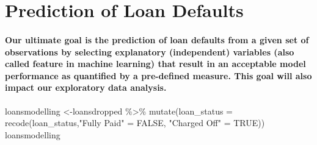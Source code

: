 \documentclass[
]{article}
\newenvironment{Shaded}{\begin{snugshade}}{\end{snugshade}}
\newcommand{\AttributeTok}[1]{\textcolor[rgb]{0.77,0.63,0.00}{#1}}
\newcommand{\ConstantTok}[1]{\textcolor[rgb]{0.00,0.00,0.00}{#1}}
\newcommand{\FunctionTok}[1]{\textcolor[rgb]{0.00,0.00,0.00}{#1}}
\newcommand{\NormalTok}[1]{#1}
\newcommand{\OtherTok}[1]{\textcolor[rgb]{0.56,0.35,0.01}{#1}}
\newcommand{\SpecialCharTok}[1]{\textcolor[rgb]{0.00,0.00,0.00}{#1}}
\newcommand{\StringTok}[1]{\textcolor[rgb]{0.31,0.60,0.02}{#1}}
\begin{document}
\hypertarget{prediction-of-loan-defaults}{%
\section{Prediction of Loan
Defaults}\label{prediction-of-loan-defaults}}

\hypertarget{our-ultimate-goal-is-the-prediction-of-loan-defaults-from-a-given-set-of-observations-by-selecting-explanatory-independent-variables-also-called-feature-in-machine-learning-that-result-in-an-acceptable-model-performance-as-quantified-by-a-pre-defined-measure.-this-goal-will-also-impact-our-exploratory-data-analysis.}{%
\paragraph{Our ultimate goal is the prediction of loan defaults from a
given set of observations by selecting explanatory (independent)
variables (also called feature in machine learning) that result in an
acceptable model performance as quantified by a pre-defined measure.
This goal will also impact our exploratory data
analysis.}\label{our-ultimate-goal-is-the-prediction-of-loan-defaults-from-a-given-set-of-observations-by-selecting-explanatory-independent-variables-also-called-feature-in-machine-learning-that-result-in-an-acceptable-model-performance-as-quantified-by-a-pre-defined-measure.-this-goal-will-also-impact-our-exploratory-data-analysis.}}

\begin{Shaded}
\begin{Highlighting}[]
\NormalTok{loansmodelling }\OtherTok{\textless{}{-}}\NormalTok{loansdropped }\SpecialCharTok{\%\textgreater{}\%}
  \FunctionTok{mutate}\NormalTok{(}\AttributeTok{loan\_status =} \FunctionTok{recode}\NormalTok{(loan\_status,}\StringTok{"Fully Paid"} \OtherTok{=} \ConstantTok{FALSE}\NormalTok{, }\StringTok{"Charged Off"} \OtherTok{=} \ConstantTok{TRUE}\NormalTok{)) }
\NormalTok{loansmodelling}
\end{Highlighting}
\end{Shaded}
\end{document}
